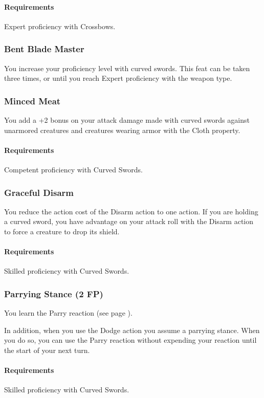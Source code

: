     \paragraph{Requirements} Expert proficiency with Crossbows.
\subsubsection{Bent Blade Master} \label{feat::bentblademaster}
    You increase your proficiency level with curved swords.
    This feat can be taken three times, or until you reach Expert proficiency with the weapon type.
\subsubsection{Minced Meat} \label{feat::mincedmeat}
    You add a +2 bonus on your attack damage made with curved swords against unarmored creatures and creatures wearing armor with the Cloth property.
    \paragraph{Requirements} Competent proficiency with Curved Swords.
\subsubsection{Graceful Disarm} \label{feat::gracefuldisarm}
    You reduce the action cost of the Disarm action to one action.
    If you are holding a curved sword, you have advantage on your attack roll with the Disarm action to force a creature to drop its shield.
    \paragraph{Requirements} Skilled proficiency with Curved Swords.
\subsubsection{Parrying Stance (2 FP)} \label{feat::parryingstance}
    You learn the Parry reaction (see page \pageref{act::parry}).

    In addition, when you use the Dodge action you assume a parrying stance.
    When you do so, you can use the Parry reaction without expending your reaction until the start of your next turn.
    \paragraph{Requirements} Skilled proficiency with Curved Swords.
